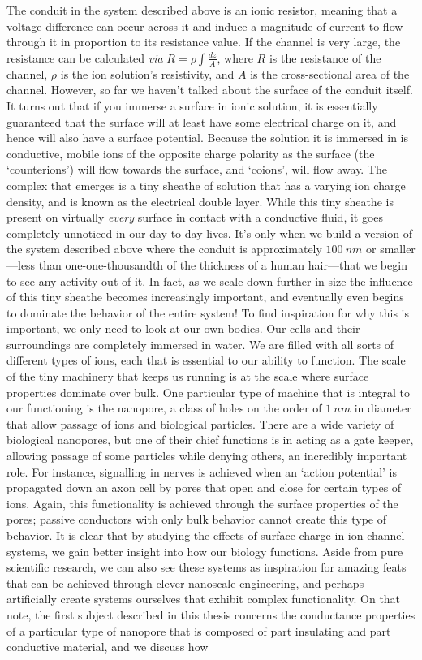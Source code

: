 	The conduit in the system described above is an ionic resistor, meaning that a voltage difference can occur across it and induce a magnitude of current to flow through it in proportion to its resistance value. If the channel is very large, the resistance can be calculated \textit{via} $R=\rho\int\frac{dz}{A}$, where $R$ is the resistance of the channel, $\rho$ is the ion solution's resistivity, and $A$ is the cross-sectional area of the channel. However, so far we haven't talked about the surface of the conduit itself. It turns out that if you immerse a surface in ionic solution, it is essentially guaranteed that the surface will at least have some electrical charge on it, and hence will also have a surface potential. Because the solution it is immersed in is conductive, mobile ions of the opposite charge polarity as the surface (the `counterions') will flow towards the surface, and `coions', will flow away. The complex that emerges is a tiny sheathe of solution that has a varying ion charge density, and is known as the electrical double layer. While this tiny sheathe is present on virtually \textit{every} surface in contact with a conductive fluid, it goes completely unnoticed in our day-to-day lives. It's only when we build a version of the system described above where the conduit is approximately $\SI{100}{nm}$ or smaller---less than one-one-thousandth of the thickness of a human hair---that we begin to see any activity out of it. In fact, as we scale down further in size the influence of this tiny sheathe becomes increasingly important, and eventually even begins to dominate the behavior of the entire system! To find inspiration for why this is important, we only need to look at our own bodies. Our cells and their surroundings are completely immersed in water. We are filled with all sorts of different types of ions, each that is essential to our ability to function. The scale of the tiny machinery that keeps us running is at the scale where surface properties dominate over bulk. One particular type of machine that is integral to our functioning is the nanopore, a class of holes on the order of $\SI{1}{nm}$ in diameter that allow passage of ions and biological particles. There are a wide variety of biological nanopores, but one of their chief functions is in acting as a gate keeper, allowing passage of some particles while denying others, an incredibly important role. For instance, signalling in nerves is achieved when an `action potential' is propagated down an axon cell by pores that open and close for certain types of ions. Again, this functionality is achieved through the surface properties of the pores; passive conductors with only bulk behavior cannot create this type of behavior. It is clear that by studying the effects of surface charge in ion channel systems, we gain better insight into how our biology functions. Aside from pure scientific research, we can also see these systems as inspiration for amazing feats that can be achieved through clever nanoscale engineering, and perhaps artificially create systems ourselves that exhibit complex functionality. On that note, the first subject described in this thesis concerns the conductance properties of a particular type of nanopore that is composed of part insulating and part conductive material, and we discuss how 